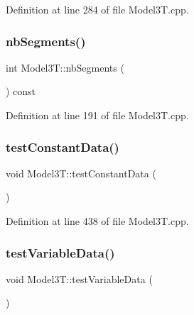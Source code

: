 Definition at line 284 of file Model3\+T.\+cpp.

\hypertarget{classModel3T_af8ca577236d173d0f7860263fb7872a4}{}\label{classModel3T_af8ca577236d173d0f7860263fb7872a4} 
\subsubsection{\texorpdfstring{nb\+Segments()}{nbSegments()}}
{\footnotesize\ttfamily int Model3\+T\+::nb\+Segments (\begin{DoxyParamCaption}{ }\end{DoxyParamCaption}) const\hspace{0.3cm}{\ttfamily [virtual]}}



Definition at line 191 of file Model3\+T.\+cpp.

\hypertarget{classModel3T_a798623e95a444c26dab02b874ee1ae89}{}\label{classModel3T_a798623e95a444c26dab02b874ee1ae89} 
\subsubsection{\texorpdfstring{test\+Constant\+Data()}{testConstantData()}}
{\footnotesize\ttfamily void Model3\+T\+::test\+Constant\+Data (\begin{DoxyParamCaption}{ }\end{DoxyParamCaption})}



Definition at line 438 of file Model3\+T.\+cpp.

\hypertarget{classModel3T_a8f52bbc47b370c56b55dc4784bcd6fb2}{}\label{classModel3T_a8f52bbc47b370c56b55dc4784bcd6fb2} 
\subsubsection{\texorpdfstring{test\+Variable\+Data()}{testVariableData()}}
{\footnotesize\ttfamily void Model3\+T\+::test\+Variable\+Data (\begin{DoxyParamCaption}{ }\end{DoxyParamCaption})}



